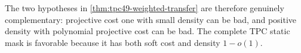 The two hypotheses in \cref{thm:tpc49-weighted-transfer} are therefore
genuinely complementary: projective cost one with small density can be
bad, and positive density with polynomial projective cost can be bad.
The complete TPC static mask is favorable because it has both soft cost
and density \(1-o(1)\).

